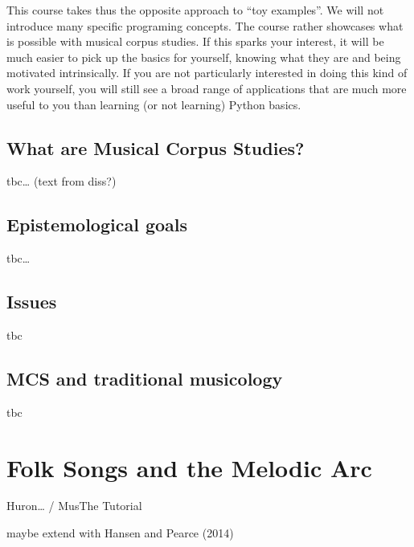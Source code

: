 \documentclass[letterpaper,10pt,english]{sphinxmanual}
\begin{document}
This course takes thus the opposite approach to “toy examples”. We will not introduce many specific
programing concepts. The course rather showcases what is possible with musical corpus studies.
If this sparks your interest, it will be much easier to pick up the basics for yourself,
knowing what they are  and being motivated intrinsically.
If you are not particularly interested in doing this kind of work yourself,
you will still see a broad range of applications that are much more useful to you than
learning (or not learning) Python basics.


\section{What are Musical Corpus Studies?}
\label{\detokenize{2_introduction:what-are-musical-corpus-studies}}
tbc… (text from diss?)


\section{Epistemological goals}
\label{\detokenize{2_introduction:epistemological-goals}}
tbc…


\section{Issues}
\label{\detokenize{2_introduction:issues}}
tbc 


\section{MCS and traditional musicology}
\label{\detokenize{2_introduction:mcs-and-traditional-musicology}}
tbc


\chapter{Folk Songs and the Melodic Arc}
\label{\detokenize{3_folk_songs:folk-songs-and-the-melodic-arc}}\label{\detokenize{3_folk_songs::doc}}
Huron… / MusThe Tutorial

maybe extend with Hansen and Pearce (2014)
\end{document}
